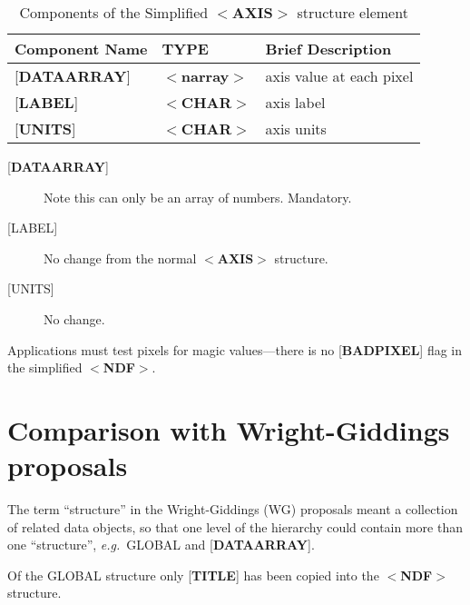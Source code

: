 \documentclass[twoside,11pt]{article}
\newcommand{\xlabel}[1]{}
\renewcommand{\_}{\texttt{\symbol{95}}}
\begin{document}
\begin{table}[htb]
\centering
\caption{Components of the Simplified $<${\bf AXIS}$>$ structure element}
\begin{tabular}{|l|l|l|}
\hline
Component Name & TYPE & Brief Description \\ \hline
{[}{\bf DATA\_ARRAY}{]} & $<${\bf narray}$>$ & axis value at each pixel \\
{[}{\bf LABEL}{]} & $<${\bf \_CHAR}$>$ & axis label \\
{[}{\bf UNITS}{]} & $<${\bf \_CHAR}$>$ & axis units \\ \hline
\end{tabular}
\end{table}

\begin{description}
\item [{[}{\bf DATA\_ARRAY}{]}]  Note this can only be an array of numbers.
Mandatory.
\item [{[}LABEL{]}]  No change from the normal $<${\bf AXIS}$>$ structure.
\item [{[}UNITS{]}]  No change.
\end{description}
Applications must test pixels for magic values---there is no
{[}{\bf BAD\_PIXEL}{]} flag in the simplified $<${\bf NDF}$>$.

\xlabel{se_comparison}\section{Comparison with Wright-Giddings proposals\label{se:comparison}}

The term ``structure'' in the Wright-Giddings (WG) proposals meant
a collection of related data objects, so that one level of the hierarchy
could contain more than one ``structure'', {\it e.g.}\  GLOBAL and
{[}{\bf DATA\_ARRAY}{]}.

Of the GLOBAL structure only {[}{\bf TITLE}{]} has been copied into the
$<${\bf NDF}$>$ structure.
\end{document}
